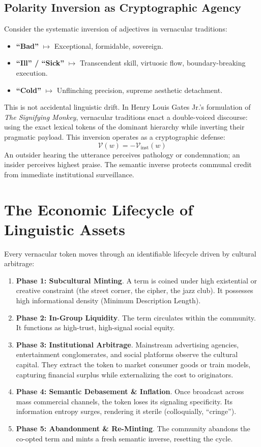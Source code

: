\documentclass[11pt]{article}
\begin{document}
\subsection{Polarity Inversion as Cryptographic Agency}
Consider the systematic inversion of adjectives in vernacular traditions:
\begin{itemize}
    \item \textbf{``Bad''} $\mapsto$ Exceptional, formidable, sovereign.
    \item \textbf{``Ill'' / ``Sick''} $\mapsto$ Transcendent skill, virtuosic flow, boundary-breaking execution.
    \item \textbf{``Cold''} $\mapsto$ Unflinching precision, supreme aesthetic detachment.
\end{itemize}

This is not accidental linguistic drift. In Henry Louis Gates Jr.'s formulation of \textit{The Signifying Monkey}, vernacular traditions enact a double-voiced discourse: using the exact lexical tokens of the dominant hierarchy while inverting their pragmatic payload. This inversion operates as a cryptographic defense:
\begin{equation}
    \mathcal{V}(w) = - \mathcal{V}_{\text{inst}}(w)
\end{equation}
An outsider hearing the utterance perceives pathology or condemnation; an insider perceives highest praise. The semantic inverse protects communal credit from immediate institutional surveillance.

\section{The Economic Lifecycle of Linguistic Assets}

Every vernacular token moves through an identifiable lifecycle driven by cultural arbitrage:

\begin{enumerate}
    \item \textbf{Phase 1: Subcultural Minting}. A term is coined under high existential or creative constraint (the street corner, the cipher, the jazz club). It possesses high informational density (Minimum Description Length).
    \item \textbf{Phase 2: In-Group Liquidity}. The term circulates within the community. It functions as high-trust, high-signal social equity.
    \item \textbf{Phase 3: Institutional Arbitrage}. Mainstream advertising agencies, entertainment conglomerates, and social platforms observe the cultural capital. They extract the token to market consumer goods or train models, capturing financial surplus while externalizing the cost to originators.
    \item \textbf{Phase 4: Semantic Debasement \& Inflation}. Once broadcast across mass commercial channels, the token loses its signaling specificity. Its information entropy surges, rendering it sterile (colloquially, ``cringe'').
    \item \textbf{Phase 5: Abandonment \& Re-Minting}. The community abandons the co-opted term and mints a fresh semantic inverse, resetting the cycle.
\end{enumerate}
\end{document}
